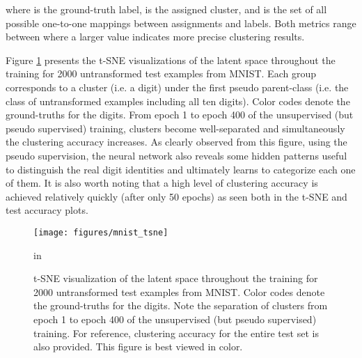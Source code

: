\documentclass{article} \usepackage{iclr2018_conference,times}
\begin{document}
where  is the ground-truth label,  is the assigned cluster, and  is the set of all possible one-to-one mappings between assignments and labels. Both metrics range between  where a larger value indicates more precise clustering results.

Figure \ref{fig:pseudo_img_tsne} presents the t-SNE \citep{maaten2008tsne} visualizations of the latent space  throughout the training for 2000 untransformed test examples from MNIST. Each group corresponds to a cluster (i.e. a digit) under the first pseudo parent-class (i.e. the class of untransformed examples including all ten digits). Color codes denote the ground-truths for the digits. From epoch 1 to epoch 400 of the unsupervised (but pseudo supervised) training, clusters become well-separated and simultaneously the clustering accuracy increases. As clearly observed from this figure, using the pseudo supervision, the neural network also reveals some hidden patterns useful to distinguish the real digit identities and ultimately learns to categorize each one of them. It is also worth noting that a high level of clustering accuracy is achieved relatively quickly (after only 50 epochs) as seen both in the t-SNE and test accuracy plots.
\begin{figure}[h]
	\begin{center}
		\centerline{\texttt{[image: figures/mnist\_tsne]}}
		\caption{t-SNE visualization of the latent space  throughout the training for 2000 untransformed test examples from MNIST. Color codes denote the ground-truths for the digits. Note the separation of clusters from epoch 1 to epoch 400 of the unsupervised (but pseudo supervised) training. For reference, clustering accuracy for the entire test set is also provided. This figure is best viewed in color.}
		\label{fig:pseudo_img_tsne}
	\end{center}
	 in
\end{figure}
\end{document}
